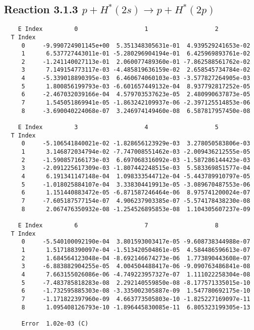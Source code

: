 \documentclass[12pt]{article}
\begin{document}
                               


\newpage
\subsection{
Reaction 3.1.3 $   p + H^*(2s) \rightarrow p + H^*(2p)$}


\begin{small}\begin{verbatim}
    E Index         0                   1                   2
  T Index
     0     -9.990724901145e+00  5.351348305631e-01  4.939529241653e-02
     1      6.537727443011e-01 -5.280296904194e-01  6.425969893761e-02
     2     -1.241140027113e-01  2.060077489360e-01 -7.862588561762e-02
     3      7.149154773117e-03 -4.485819636159e-02  2.658545734784e-02
     4     -5.339018890395e-03  6.460674060103e-03 -3.577827264905e-03
     5      1.800856199793e-03 -6.601657449132e-04  8.937792817252e-05
     6     -2.467032039166e-04  4.579703537623e-05  2.480990637873e-05
     7      1.545051869941e-05 -1.863242109937e-06 -2.397125514853e-06
     8     -3.690040224068e-07  3.246974149460e-08  6.587817957450e-08

    E Index         3                   4                   5
  T Index
     0     -5.106541840021e-02 -1.828656123929e-03  3.278050583806e-03
     1      3.146872034794e-02 -7.747008551462e-03 -2.009436212555e-05
     2     -1.590857166173e-03  6.697068316092e-03 -1.587286144423e-03
     3     -2.091225617309e-03 -1.807442248515e-03  5.583369851577e-04
     4      6.191341147148e-04  1.098333544712e-04 -5.443789910797e-05
     5     -1.018025884107e-04  3.338304419913e-05 -3.089670487553e-06
     6      1.151440883472e-05 -6.871587246464e-06  8.975741200024e-07
     7     -7.605187577154e-07  4.906237903385e-07 -5.574178438230e-08
     8      2.067476350932e-08 -1.254526895853e-08  1.104305607237e-09

    E Index         6                   7                   8
  T Index
     0     -5.540100092190e-04  3.801593003417e-05 -9.608738344988e-07
     1      1.517188390097e-04 -1.513420504861e-05  4.584486596613e-07
     2      1.684564123048e-04 -8.692146674273e-06  1.773890443608e-07
     3     -6.883882904255e-05  4.004504488417e-06 -9.090763486841e-08
     4      7.663155026086e-06 -4.749223957327e-07  1.111022258304e-08
     5     -7.483785818283e-08  2.292140559850e-08 -8.177571335015e-10
     6     -1.732595885303e-08 -3.335002305887e-09  1.547780692175e-10
     7     -1.171822397960e-09  4.663773505803e-10 -1.825227169097e-11
     8      1.095408126793e-10 -1.896445830085e-11  6.805323199305e-13

     Error  1.02e-03 (C)
\end{verbatim}\end{small}
\end{document}
